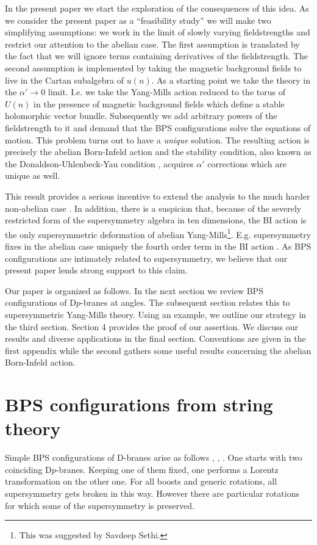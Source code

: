 \documentclass[a4paper,12pt,oneside]{article}
\begin{document}
In the present paper we start the exploration of the consequences of this
idea. As we consider the present paper as a ``feasibility study'' we will
make two simplifying assumptions: we work in the limit of slowly varying
fieldstrengths and restrict our attention to the abelian case. The first
assumption is translated by the fact that we will ignore terms containing
derivatives of the fieldstrength. The second assumption is implemented by
taking the magnetic background fields to live in the Cartan subalgebra of
$u(n)$. As a starting point we take the theory in the $\alpha
'\rightarrow 0$ limit. I.e. we take the Yang-Mills action reduced to the
torus of $U(n)$ in the presence of magnetic background fields which
define a stable holomorphic vector bundle. Subsequently we add arbitrary
powers of the fieldstrength to it and demand that the BPS configurations
solve the equations of motion. This problem turns out to have a {\em
unique} solution. The resulting action is precisely the abelian
Born-Infeld action and the stability condition, also known as the
Donaldson-Uhlenbeck-Yau condition \cite{DUY}, acquires $\alpha '$
corrections which are unique as well.

This result provides a serious incentive to extend the analysis to the
much harder non-abelian case \cite{wij}. In addition, there is a
suspicion that, because of the severely restricted form of the
supersymmetry algebra in ten dimensions, the BI action is the only
supersymmetric deformation of abelian Yang-Mills\footnote{This was
suggested by Savdeep Sethi.}. E.g. supersymmetry fixes in the abelian
case uniquely the fourth order term in the BI action \cite{BMT}. As BPS
configurations are intimately related to supersymmetry, we believe that our
present paper lends strong support to this claim.

Our paper is organized as follows. In the next section we review BPS
configurations of D$p$-branes at angles. The subsequent section relates
this to supersymmetric Yang-Mills theory. Using an example, we outline
our strategy in the third section. Section 4 provides the proof of our
assertion. We discuss our results and diverse applications in the final
section. Conventions are given in the first appendix while the second
gathers some useful results concerning the abelian Born-Infeld action.

\setcounter{equation}{0}
\section{BPS configurations from string theory}
Simple BPS configurations of D-branes arise as follows \cite{Angles1}, 
\cite{Angles2}, \cite{townsend}. 
One starts with two coinciding D$p$-branes. Keeping one of them fixed, 
one performs a Lorentz transformation on the other one.
For all boosts and generic rotations, 
all supersymmetry gets broken in this way. 
However there are particular rotations for 
which some of the supersymmetry is preserved. 
\end{document}
